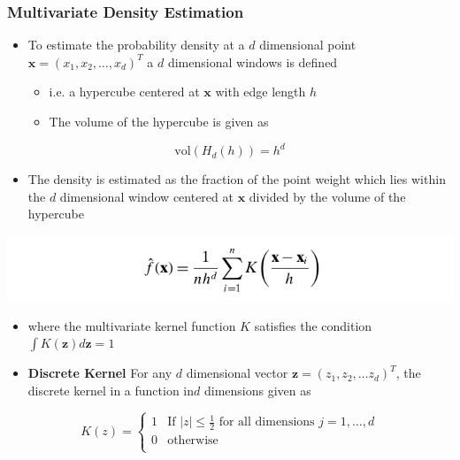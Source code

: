 \documentclass[11pt]{article}
\begin{document}
\subsubsection{Multivariate Density Estimation}
\label{sec:org4fc34bc}
\begin{itemize}
\item To estimate the probability density at a \(d\) dimensional point \(\pmb x = (x_1, x_2, \dots, x_d)^T\) a \(d\) dimensional windows is defined
\begin{itemize}
\item i.e. a hypercube centered at \(\pmb x\) with edge length \(h\)
\item The volume of the hypercube is given as
\end{itemize}
\end{itemize}
\begin{equation}
  \text{vol}(H_d(h)) = h^d
\end{equation}
\begin{itemize}
\item The density is estimated as the fraction of the point weight which lies within the \(d\) dimensional window centered at \(\pmb x\) divided by the volume of the hypercube
\end{itemize}
\begin{center}
\includegraphics[width=.9\linewidth]{Density-based Clustering/screenshot_2018-12-01_12-43-21.png}
\end{center}
\begin{itemize}
\item where the multivariate kernel function \(K\) satisfies the condition \(\int K(\pmb z) d \pmb z = 1\)

\item \textbf{Discrete Kernel} For any \(d\) dimensional vector \(\pmb z = (z_1, z_2, \dots z_d)^T\), the discrete kernel in a function in\(d\) dimensions given as
\end{itemize}
\begin{equation}
  	K(z) =
  		\begin{cases}
  			\mbox{$1$} & \mbox{If $|z| \leq \frac12$} \text{ for all dimensions } j=1,\dots,d\\
  			\mbox{$0$} & \mbox{otherwise} \\
  		\end{cases}
\end{equation}
\end{document}
